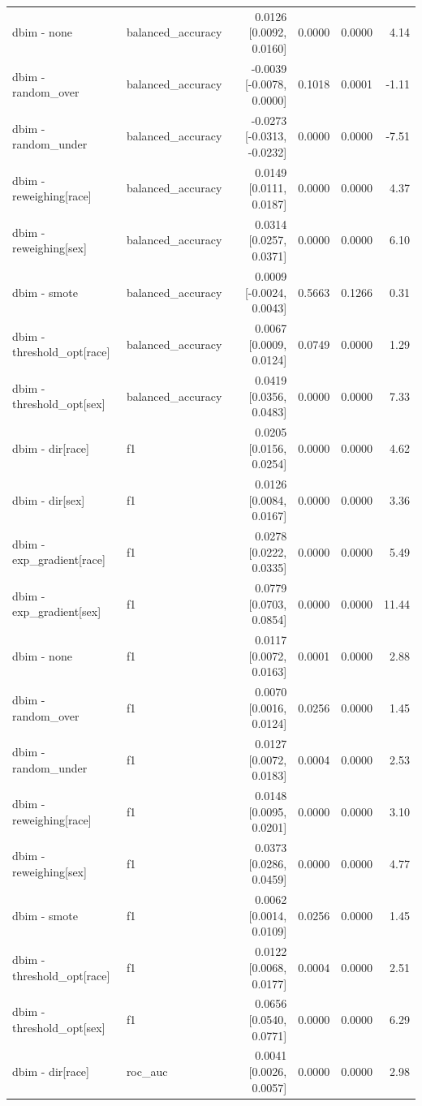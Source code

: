 \begin{table}[t]
{\begin{tabular}{llrrrr}
dbim - none & balanced\_accuracy & 0.0126 [0.0092, 0.0160] & 0.0000 & 0.0000 & 4.14 \\
dbim - random\_over & balanced\_accuracy & -0.0039 [-0.0078, 0.0000] & 0.1018 & 0.0001 & -1.11 \\
dbim - random\_under & balanced\_accuracy & -0.0273 [-0.0313, -0.0232] & 0.0000 & 0.0000 & -7.51 \\
dbim - reweighing[race] & balanced\_accuracy & 0.0149 [0.0111, 0.0187] & 0.0000 & 0.0000 & 4.37 \\
dbim - reweighing[sex] & balanced\_accuracy & 0.0314 [0.0257, 0.0371] & 0.0000 & 0.0000 & 6.10 \\
dbim - smote & balanced\_accuracy & 0.0009 [-0.0024, 0.0043] & 0.5663 & 0.1266 & 0.31 \\
dbim - threshold\_opt[race] & balanced\_accuracy & 0.0067 [0.0009, 0.0124] & 0.0749 & 0.0000 & 1.29 \\
dbim - threshold\_opt[sex] & balanced\_accuracy & 0.0419 [0.0356, 0.0483] & 0.0000 & 0.0000 & 7.33 \\
dbim - dir[race] & f1 & 0.0205 [0.0156, 0.0254] & 0.0000 & 0.0000 & 4.62 \\
dbim - dir[sex] & f1 & 0.0126 [0.0084, 0.0167] & 0.0000 & 0.0000 & 3.36 \\
dbim - exp\_gradient[race] & f1 & 0.0278 [0.0222, 0.0335] & 0.0000 & 0.0000 & 5.49 \\
dbim - exp\_gradient[sex] & f1 & 0.0779 [0.0703, 0.0854] & 0.0000 & 0.0000 & 11.44 \\
dbim - none & f1 & 0.0117 [0.0072, 0.0163] & 0.0001 & 0.0000 & 2.88 \\
dbim - random\_over & f1 & 0.0070 [0.0016, 0.0124] & 0.0256 & 0.0000 & 1.45 \\
dbim - random\_under & f1 & 0.0127 [0.0072, 0.0183] & 0.0004 & 0.0000 & 2.53 \\
dbim - reweighing[race] & f1 & 0.0148 [0.0095, 0.0201] & 0.0000 & 0.0000 & 3.10 \\
dbim - reweighing[sex] & f1 & 0.0373 [0.0286, 0.0459] & 0.0000 & 0.0000 & 4.77 \\
dbim - smote & f1 & 0.0062 [0.0014, 0.0109] & 0.0256 & 0.0000 & 1.45 \\
dbim - threshold\_opt[race] & f1 & 0.0122 [0.0068, 0.0177] & 0.0004 & 0.0000 & 2.51 \\
dbim - threshold\_opt[sex] & f1 & 0.0656 [0.0540, 0.0771] & 0.0000 & 0.0000 & 6.29 \\
dbim - dir[race] & roc\_auc & 0.0041 [0.0026, 0.0057] & 0.0000 & 0.0000 & 2.98 \\

\end{tabular}}
\end{table}
